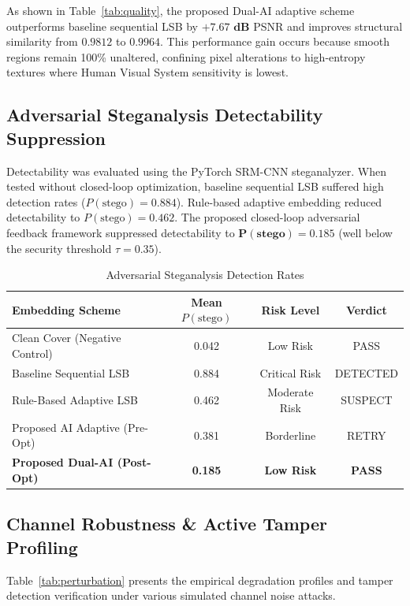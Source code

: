 \documentclass[conference]{IEEEtran}
\begin{document}
As shown in Table~\ref{tab:quality}, the proposed Dual-AI adaptive scheme outperforms baseline sequential LSB by $\mathbf{+7.67\text{ dB}}$ PSNR and improves structural similarity from $0.9812$ to $0.9964$. This performance gain occurs because smooth regions remain 100\% unaltered, confining pixel alterations to high-entropy textures where Human Visual System sensitivity is lowest.

\subsection{Adversarial Steganalysis Detectability Suppression}
Detectability was evaluated using the PyTorch SRM-CNN steganalyzer. When tested without closed-loop optimization, baseline sequential LSB suffered high detection rates ($P(\text{stego}) = 0.884$). Rule-based adaptive embedding reduced detectability to $P(\text{stego}) = 0.462$. The proposed closed-loop adversarial feedback framework suppressed detectability to $\mathbf{P(\text{stego}) = 0.185}$ (well below the security threshold $\tau = 0.35$).

\begin{table}[htbp]
\caption{Adversarial Steganalysis Detection Rates}
\label{tab:detectability}
\centering
\begin{tabular}{@{}lccc@{}}
\toprule
\textbf{Embedding Scheme} & \textbf{Mean $P(\text{stego})$} & \textbf{Risk Level} & \textbf{Verdict} \\
\midrule
Clean Cover (Negative Control)   & 0.042 & Low Risk      & PASS \\
Baseline Sequential LSB          & 0.884 & Critical Risk & DETECTED \\
Rule-Based Adaptive LSB          & 0.462 & Moderate Risk & SUSPECT \\
Proposed AI Adaptive (Pre-Opt)   & 0.381 & Borderline    & RETRY \\
\textbf{Proposed Dual-AI (Post-Opt)} & \textbf{0.185} & \textbf{Low Risk} & \textbf{PASS} \\
\bottomrule
\end{tabular}
\end{table}

\subsection{Channel Robustness \& Active Tamper Profiling}
Table~\ref{tab:perturbation} presents the empirical degradation profiles and tamper detection verification under various simulated channel noise attacks.
\end{document}
